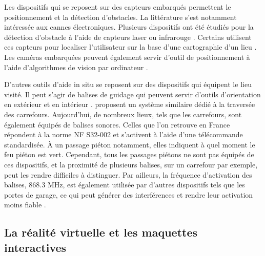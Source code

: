 \newpage{}

Les dispositifs qui se reposent sur des capteurs embarqués permettent le positionnement et la détection d'obstacles. La littérature s'est notamment intéressée aux cannes électroniques. Plusieurs dispositifs ont été étudiés pour la détection d'obstacle à l'aide de capteurs laser ou infrarouge \citep{Damaschini2005}. Certains utilisent ces capteurs pour localiser l'utilisateur sur la base d'une cartographie d'un lieu \citep{Connier2018}. Les caméras embarquées peuvent également servir d'outil de positionnement à l'aide d'algorithmes de vision par ordinateur \citep{Duh2021}.

\newpar{}

D'autres outils d'aide in situ se reposent sur des dispositifs qui équipent le lieu visité. Il peut s'agir de balises de guidage qui peuvent servir d'outils d'orientation en extérieur et en intérieur \citep{Ahmetovic2016, Cheraghi2017}. \citet{Shin2022} proposent un système similaire dédié à la traversée des carrefours. Aujourd'hui, de nombreux lieux, tels que les carrefours, sont également équipés de balises sonores. Celles que l'on retrouve en France répondent à la norme NF S32-002 \citep{NFS32002_2004} et s'activent à l'aide d'une télécommande standardisée. À un passage piéton notamment, elles indiquent à quel moment le feu piéton est vert. Cependant, tous les passages piétons ne sont pas équipés de ces dispositifs, et la proximité de plusieurs balises, sur un carrefour par exemple, peut les rendre difficiles à distinguer. Par ailleurs, la fréquence d'activation des balises, 868.3 MHz, est également utilisée par d'autres dispositifs tels que les portes de garage, ce qui peut générer des interférences et rendre leur activation moins fiable \citep{Rahal2021}.

\subsection{La réalité virtuelle et les maquettes interactives}



